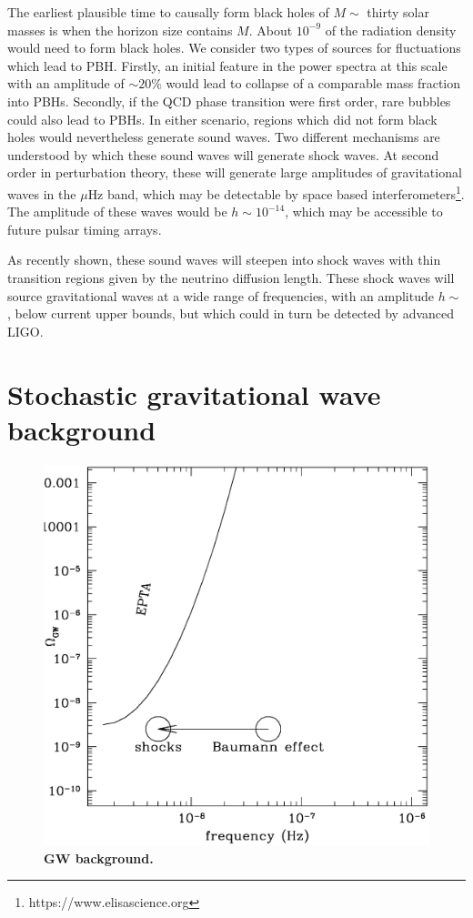 \documentclass{nature}
\begin{document}
The earliest plausible time to causally form black holes of $M\sim$
thirty solar masses is when the horizon size contains $M$.  About
$10^{-9}$ of the radiation density would need to form black holes.  We
consider two types of sources for fluctuations which lead to PBH.
Firstly, an initial feature in the power spectra at this scale with an
amplitude of $\sim 20\%$ would lead to collapse of a comparable mass
fraction into PBHs\cite{Kühnel2016}.  Secondly, if the QCD phase
transition were first order, rare bubbles could also lead to PBHs.  In
either scenario, regions which did not form black holes would
nevertheless generate sound waves.  Two different mechanisms are
understood by which these sound waves will generate shock waves.  At
second order in perturbation theory, these will generate large
amplitudes of gravitational waves in the $\mu$Hz
band\cite{2007PhRvD..76h4019B}, which may be detectable by space based
interferometers\footnote{https://www.elisascience.org}.  The amplitude
of these waves would be $h \sim 10^{-14}$, which may be accessible to
future pulsar timing arrays\cite{kramer04}.

As recently shown\cite{2015arXiv151002985P}, these sound waves will
steepen into shock waves with thin transition regions given by the
neutrino diffusion length\cite{2014PhRvL.113f1301J}.  These shock
waves will source gravitational waves at a wide range of frequencies,
with an amplitude $h\sim$, below current upper
bounds\cite{2015PhRvD..91b2003A}, but which could in turn be detected
by advanced LIGO.

\section{Stochastic gravitational wave background}
\begin{figure} \centering
  \includegraphics[width=1.0\linewidth]{gw.eps}
  \caption{\textbf{GW background.}
}
  \label{fig:gw}
\end{figure}
\end{document}
